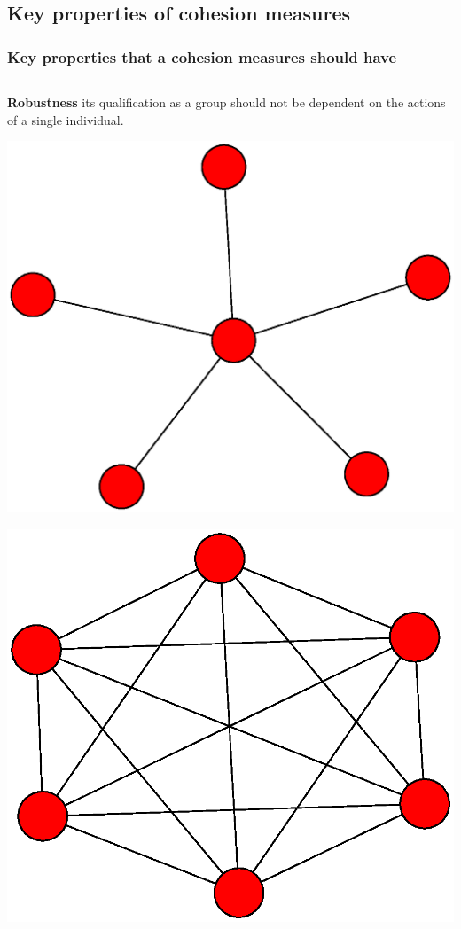 \documentclass[ignorenonframetext,red,8pt,notes=show]{beamer}
\begin{document}
\subsection{Key properties of cohesion measures}

\begin{frame}[label=]
\frametitle{Key properties that a cohesion measures should have}

\begin{columns}[c]
\begin{column}{0.3\textwidth}
\textbf{Robustness} its qualification as a group should not be dependent on the actions of a single individual.

\begin{center}
\includegraphics[scale=0.1]{img/star}
\end{center}

\begin{center}
\includegraphics[scale=0.1]{img/complete}
\end{center}
\end{column}


\end{columns}
\end{frame}
\end{document}
